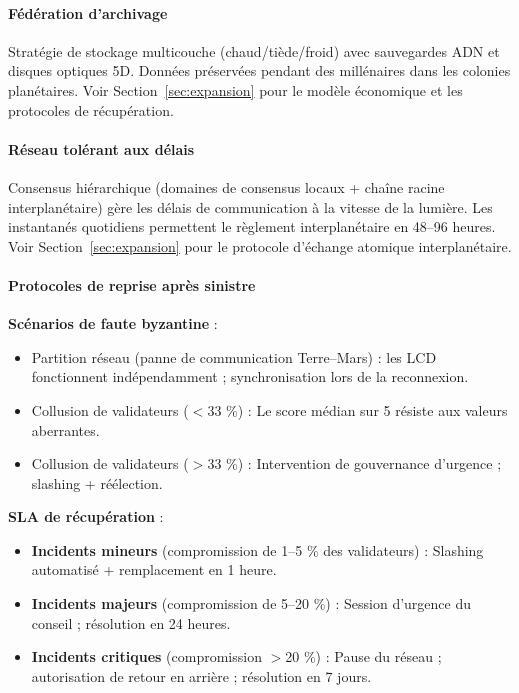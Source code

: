 \documentclass[11pt]{article}
\begin{document}
\paragraph{Fédération d'archivage}
Stratégie de stockage multicouche (chaud/tiède/froid) avec sauvegardes ADN et disques optiques 5D. Données préservées pendant des millénaires dans les colonies planétaires. Voir Section~\ref{sec:expansion} pour le modèle économique et les protocoles de récupération.

\paragraph{Réseau tolérant aux délais}
Consensus hiérarchique (domaines de consensus locaux + chaîne racine interplanétaire) gère les délais de communication à la vitesse de la lumière. Les instantanés quotidiens permettent le règlement interplanétaire en 48--96 heures. Voir Section~\ref{sec:expansion} pour le protocole d'échange atomique interplanétaire.

\paragraph{Protocoles de reprise après sinistre}
\textbf{Scénarios de faute byzantine} :
\begin{itemize}[noitemsep]
  \item Partition réseau (panne de communication Terre--Mars) : les LCD fonctionnent indépendamment ; synchronisation lors de la reconnexion.
  \item Collusion de validateurs ($<$33 \%) : Le score médian sur 5 résiste aux valeurs aberrantes.
  \item Collusion de validateurs ($>$33 \%) : Intervention de gouvernance d'urgence ; slashing + réélection.
\end{itemize}

\textbf{SLA de récupération} :
\begin{itemize}[noitemsep]
  \item \textbf{Incidents mineurs} (compromission de 1--5 \% des validateurs) : Slashing automatisé + remplacement en 1 heure.
  \item \textbf{Incidents majeurs} (compromission de 5--20 \%) : Session d'urgence du conseil ; résolution en 24 heures.
  \item \textbf{Incidents critiques} (compromission $>$20 \%) : Pause du réseau ; autorisation de retour en arrière ; résolution en 7 jours.
\end{itemize}
\end{document}
